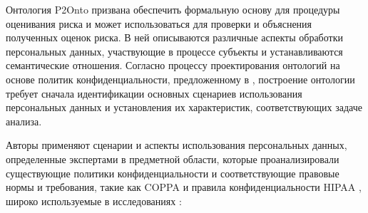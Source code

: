\documentclass[../main]{subfiles}
\begin{document}
Онтология P2Onto призвана обеспечить формальную основу для процедуры оценивания риска и может использоваться для проверки и объяснения полученных оценок риска. В ней описываются различные аспекты обработки персональных данных, участвующие в процессе субъекты и устанавливаются семантические отношения. Согласно процессу проектирования онтологий на основе политик конфиденциальности, предложенному в \cite{MDPI8}, построение онтологии требует сначала идентификации основных сценариев использования персональных данных и установления их характеристик, соответствующих задаче анализа.

Авторы \cite{P2Onto} применяют сценарии и аспекты использования персональных данных, определенные экспертами в предметной области, которые проанализировали существующие политики конфиденциальности и соответствующие правовые нормы и требования, такие как COPPA \cite{MDPI2} и правила конфиденциальности HIPAA \cite{MDPI3}, широко используемые в исследованиях \cite{MDPI6, MDPI8, MDPI18}:
\end{document}
